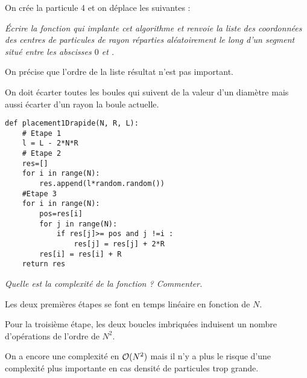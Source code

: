 On crée la particule 4 et on déplace les suivantes :
\begin{center}
\end{center}
\begin{Exercise}\it 
Écrire la fonction 
qui implante cet algorithme et renvoie la liste des coordonnées des
centres de  particules de rayon  réparties
aléatoirement le long d'un segment situé entre les abscisses $0$ et
. 

On précise que l'ordre de la liste résultat n'est pas important.
\end{Exercise}
\begin{Answer} On doit écarter toutes les boules qui suivent de la valeur d'un diamètre mais aussi écarter d'un rayon la boule actuelle.
\begin{lstlisting}
def placement1Drapide(N, R, L):
    # Etape 1
    l = L - 2*N*R
    # Etape 2
    res=[]
    for i in range(N):
        res.append(l*random.random())
    #Etape 3
    for i in range(N):
        pos=res[i]
        for j in range(N):
            if res[j]>= pos and j !=i :
                res[j] = res[j] + 2*R
        res[i] = res[i] + R
    return res
\end{lstlisting}
\end{Answer}
\begin{Exercise}\it 
Quelle est la complexité de la fonction  ? Commenter.
\end{Exercise}
\begin{Answer}
Les deux premières étapes se font en temps linéaire en fonction de $N$.

Pour la troisième étape, les deux boucles imbriquées induisent un nombre d'opérations de l'ordre de $N^2$.

On a encore une complexité en ${\cal O}(N^2)$ mais il n'y a plus le risque d'une complexité plus importante en cas densité de particules trop grande.
\end{Answer}
